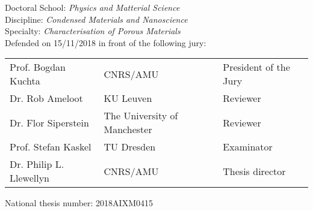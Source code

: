 \begin{titlepage}
\begin{flushleft}
	\vspace{0.2cm}
	\normalsize 
	Doctoral School: \textit{Physics and Matterial Science}\\
	Discipline: \textit{Condensed Materials and Nanoscience}\\
	Specialty: \textit{Characterisation of Porous Materials}\\
	\vspace{0.5cm}
    \normalsize Defended on 15/11/2018 in front of the following jury:\\
\end{flushleft}
\vspace{0.3cm}
\begin{tabular}{lll}
	Prof. Bogdan Kuchta & CNRS/AMU & President of the Jury \\
    \vspace{0.08cm}
	Dr. Rob Ameloot & KU Leuven & Reviewer \\
    \vspace{0.08cm}
	Dr. Flor Siperstein & The University of Manchester & Reviewer \\
    \vspace{0.08cm}
	Prof. Stefan Kaskel & TU Dresden & Examinator \\
    \vspace{0.08cm}
	Dr. Philip L. Llewellyn & CNRS/AMU & Thesis director \\
\end{tabular}
\begin{flushleft}\normalsize National thesis number: 2018AIXM0415\\\end{flushleft}

\end{titlepage}